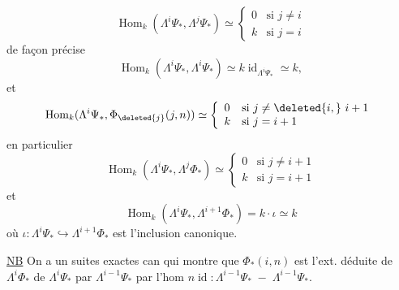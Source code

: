 \[
\operatorname{Hom}_k(\Lambda^i\Psi_*,\Lambda^j\Psi_*)\simeq
\left\{\begin{array}{ll}0&\text{si }j\neq i\\k&\text{si }j=i\end{array}\right.
\]
de façon précise
\[
\operatorname{Hom}_k(\Lambda^i\Psi_*,\Lambda^i\Psi_*)
\simeq k\operatorname{id}_{\Lambda^i\Psi_*}\simeq k,
\]
et
\[
\operatorname{Hom}_k(\Lambda^i\Psi_*,\Phi_{\deleted{j}}(j,n))\simeq
\left\{\begin{array}{ll}
0&\text{si }j\neq\deleted{i,}\ i+1\\
k&\text{si }j=i+1
\end{array}\right.
\]
en particulier
\[
\operatorname{Hom}_k(\Lambda^i\Psi_*,\Lambda^j\Phi_*)\simeq
\left\{\begin{array}{ll}0&\text{si }j\neq i+1\\k&\text{si }j=i+1\end{array}\right.
\]
et
\[
\operatorname{Hom}_k(\Lambda^i\Psi_*,\Lambda^{i+1}\Phi_*)
=k\cdot\iota\simeq k
\]
où $\iota:\Lambda^i\Psi_*\hookrightarrow\Lambda^{i+1}\Phi_*$ est l'inclusion
canonique.

\uline{NB} On a un  suites exactes can
qui montre que $\Phi_*(i,n)$ est l'ext.
déduite de  $\Lambda^i\Phi_*$ de $\Lambda^i\Psi_*$ par $\Lambda^{i-1}\Psi_*$
par l'hom $n\operatorname{id}:\Lambda^{i-1}\Psi_*\;-\;\Lambda^{i-1}\Psi_*$.
